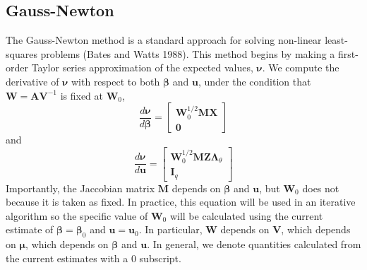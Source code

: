 \documentclass{jss}
\begin{document}
\subsection{Gauss-Newton}

The Gauss-Newton method is a standard approach for solving non-linear
least-squares problems (Bates and Watts 1988). This method begins by
making a first-order Taylor series approximation of the expected
values, $\bm\nu$. We compute the derivative of $\bm\nu$ with respect
to both $\bm\beta$ and $\bm u$, under the condition that $\bm W = \bm
A \bm V^{-1}$ is fixed at $\bm W_0$,
\begin{displaymath}
\frac{d \bm\nu}{d \bm\beta} = 
\begin{bmatrix}
\bm W_0^{1/2}\bm M \bm X \\
\bm 0
\end{bmatrix}
\end{displaymath}
and 
\begin{displaymath}
\frac{d \bm\nu}{d \bm u} = 
\begin{bmatrix}
\bm W_0^{1/2}\bm M \bm Z \bm\Lambda_\theta \\
\bm I_q
\end{bmatrix}
\end{displaymath}
Importantly, the Jaccobian matrix $\bm M$ depends on $\bm\beta$ and
$\bm u$, but $\bm W_0$ does not because it is taken as
fixed. In practice, this equation will be used in an iterative
algorithm so the specific value of $\bm W_0$ will be calculated
using the current estimate of $\bm\beta = \bm\beta_0$ and $\bm u  =
\bm u_0$. In particular, $\bm W$ depends on $\bm V$, which depends on
$\bm\mu$, which depends on $\bm\beta$ and $\bm u$. In general, we
denote quantities calculated from the current estimates with a $0$
subscript.
\end{document}
